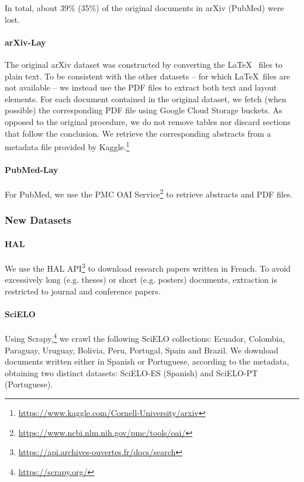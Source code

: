 In total, about 39\% (35\%) of the original documents in arXiv (PubMed) were lost.

\paragraph{arXiv-Lay}

The original arXiv dataset \citep{cohan2018discourse} was constructed by converting the \LaTeX~ files to plain text. To be consistent with the other datasets -- for which \LaTeX~files are not available -- we instead use the PDF files to extract both text and layout elements. For each document contained in the original dataset, we fetch (when possible) the corresponding PDF file using Google Cloud Storage buckets. As opposed to the original procedure, we do not remove tables nor discard sections that follow the conclusion. We retrieve the corresponding abstracts from a metadata file provided by Kaggle.\footnote{\url{https://www.kaggle.com/Cornell-University/arxiv}}

\paragraph{PubMed-Lay}

For PubMed, we use the PMC OAI Service\footnote{\url{https://www.ncbi.nlm.nih.gov/pmc/tools/oai/}} to retrieve abstracts and PDF files. 

\subsubsection{New Datasets}

\paragraph{HAL}

We use the HAL API\footnote{\url{https://api.archives-ouvertes.fr/docs/search}} to download research papers written in French. To avoid excessively long (e.g. theses) or short (e.g. posters) documents, extraction is restricted to journal and conference papers. 

\paragraph{SciELO}

Using Scrapy,\footnote{\url{https://scrapy.org/}} we crawl the following SciELO collections: Ecuador, Colombia, Paraguay, Uruguay, Bolivia, Peru, Portugal, Spain and Brazil. We download documents written either in Spanish or Portuguese, according to the metadata, obtaining two distinct datasets: SciELO-ES (Spanish) and SciELO-PT (Portuguese).

